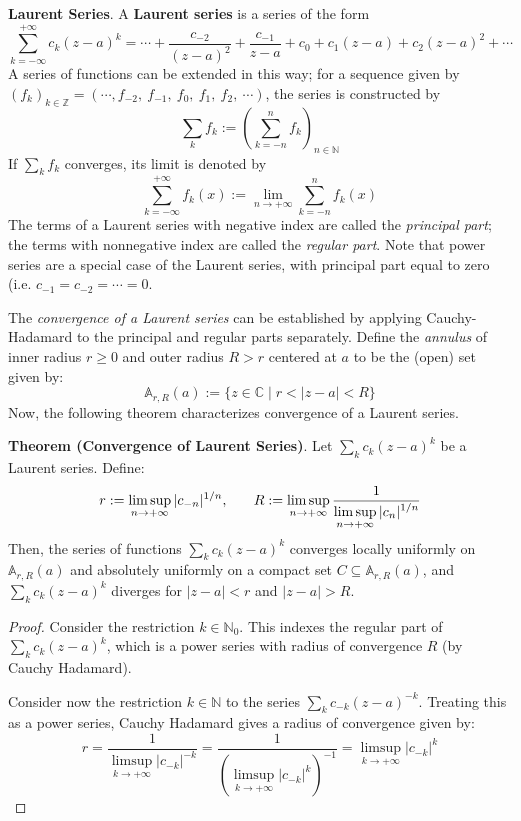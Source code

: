\begin{shaded}
    \textbf{Laurent Series}. A \textbf{Laurent series} is a series of the form \[\sum_{k=-\infty}^{+\infty} c_k (z-a)^k = \cdots + \frac{c_{-2}}{(z-a)^2} + \frac{c_{-1}}{z-a} + c_0 + c_1(z-a) + c_2(z-a)^2 + \cdots\] A series of functions can be extended in this way; for a sequence given by \((f_k)_{k\in\mathbb{Z}} = (\cdots, f_{-2},\ f_{-1},\ f_0,\ f_1,\ f_2,\ \cdots )\), the series is constructed by \[\sum_k f_k := \left(\sum_{k=-n}^n f_k\right)_{n\in\mathbb{N}}\] If $\sum_k f_k$ converges, its limit is denoted by \[\sum_{k=-\infty}^{+\infty} f_k(x) := \lim_{n\to+\infty} \sum_{k=-n}^n f_k(x)\] The terms of a Laurent series with negative index are called the \textit{principal part}; the terms with nonnegative index are called the \textit{regular part}. Note that power series are a special case of the Laurent series, with principal part equal to zero (i.e. $c_{-1}=c_{-2}=\cdots = 0$.

    The \textit{convergence of a Laurent series} can be established by applying Cauchy-Hadamard to the principal and regular parts separately. Define the \textit{annulus} of inner radius $r\geq 0$ and outer radius $R>r$ centered at $a$ to be the (open) set given by: \[\mathbb{A}_{r,R}(a) := \{z\in\mathbb{C}\mid r<|z-a|<R\}\] Now, the following theorem characterizes convergence of a Laurent series.

    \textbf{Theorem (Convergence of Laurent Series)}. Let $\sum_k c_k(z-a)^k$ be a Laurent series. Define: \[r:=\limsup_{n\to+\infty} |c_{-n}|^{1/n},\hspace{0.25in} R:=\limsup_{n\to+\infty} \frac{1}{\displaystyle\limsup_{n\to+\infty} |c_n|^{1/n}}\] Then, the series of functions $\sum_k c_k(z-a)^k$ converges locally uniformly on $\mathbb{A}_{r,R}(a)$ and absolutely uniformly on a compact set $C\subseteq\mathbb{A}_{r,R}(a)$, and $\sum_k c_k(z-a)^k$ diverges for $|z-a|<r$ and $|z-a|>R$.

    \begin{proof}
        Consider the restriction $k\in\mathbb{N}_0$. This indexes the regular part of $\sum_k c_k (z-a)^k$, which is a power series with radius of convergence $R$ (by Cauchy Hadamard).

        Consider now the restriction $k\in\mathbb{N}$ to the series $\sum_k c_{-k} (z-a)^{-k}$. Treating this as a power series, Cauchy Hadamard gives a radius of convergence given by: \[r = \frac{1}{\displaystyle\limsup_{k\to+\infty} |c_{-k}|^{-k}} = \frac{1}{\left(\displaystyle\limsup_{k\to +\infty} |c_{-k}|^k\right)^{-1}} = \limsup_{k\to +\infty} |c_{-k}|^k\]
    \end{proof}
\end{shaded}

